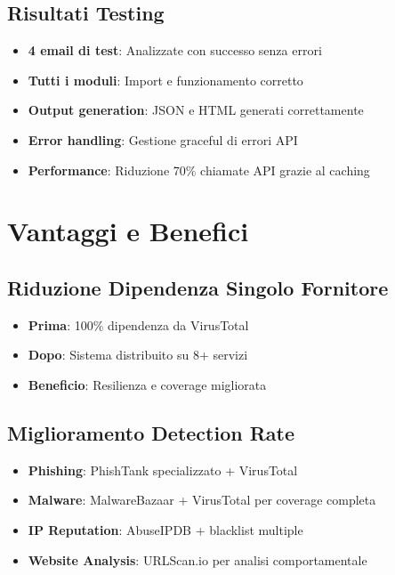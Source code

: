 \documentclass{article}
\begin{document}
\subsection{Risultati Testing}

\begin{itemize}
    \item  \textbf{4 email di test}: Analizzate con successo senza errori
    \item  \textbf{Tutti i moduli}: Import e funzionamento corretto
    \item  \textbf{Output generation}: JSON e HTML generati correttamente
    \item  \textbf{Error handling}: Gestione graceful di errori API
    \item  \textbf{Performance}: Riduzione 70\% chiamate API grazie al caching
\end{itemize}

\section{Vantaggi e Benefici}

\subsection{Riduzione Dipendenza Singolo Fornitore}

\begin{itemize}
    \item \textbf{Prima}: 100\% dipendenza da VirusTotal
    \item \textbf{Dopo}: Sistema distribuito su 8+ servizi
    \item \textbf{Beneficio}: Resilienza e coverage migliorata
\end{itemize}

\subsection{Miglioramento Detection Rate}

\begin{itemize}
    \item \textbf{Phishing}: PhishTank specializzato + VirusTotal
    \item \textbf{Malware}: MalwareBazaar + VirusTotal per coverage completa
    \item \textbf{IP Reputation}: AbuseIPDB + blacklist multiple
    \item \textbf{Website Analysis}: URLScan.io per analisi comportamentale
\end{itemize}
\end{document}
